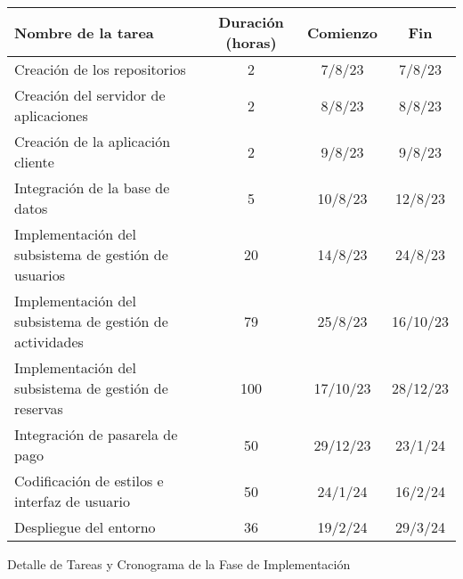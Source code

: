 \begin{planificacion}
	\centering
	\begin{tabular}{ | m{9cm} | c | c | c |}
		\hline
		\textbf{Nombre de la tarea}                             & \textbf{Duración (horas)} & \textbf{Comienzo} & \textbf{Fin} \\
		\hline
		Creación de los repositorios                            & 2                         & 7/8/23            & 7/8/23       \\
		\hline
		Creación del servidor de aplicaciones                   & 2                         & 8/8/23            & 8/8/23       \\
		\hline
		Creación de la aplicación cliente                       & 2                         & 9/8/23            & 9/8/23       \\
		\hline
		Integración de la base de datos                         & 5                         & 10/8/23           & 12/8/23      \\
		\hline
		Implementación del subsistema de gestión de usuarios    & 20                        & 14/8/23           & 24/8/23      \\
		\hline
		Implementación del subsistema de gestión de actividades & 79                        & 25/8/23           & 16/10/23     \\
		\hline
		Implementación del subsistema de gestión de reservas    & 100                       & 17/10/23          & 28/12/23     \\
		\hline
		Integración de pasarela de pago                         & 50                        & 29/12/23          & 23/1/24      \\
		\hline
		Codificación de estilos e interfaz de usuario           & 50                        & 24/1/24           & 16/2/24      \\
		\hline
		Despliegue del entorno                                  & 36                        & 19/2/24           & 29/3/24      \\
		\hline
	\end{tabular}
	\caption{Detalle de Tareas y Cronograma de la Fase de Implementación}
\end{planificacion}